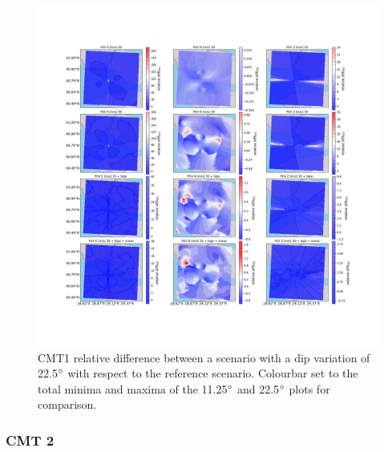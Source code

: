 \documentclass[../Text/00main.tex]{subfiles}
\begin{document}
\begin{figure}[h]
    \centering
    \includegraphics[width=1\linewidth,trim = 2cm 5cm 1cm 5cm, clip]{images_results/dip_variation_epsilon25_sc1.png}
    \caption{CMT1 relative difference between a scenario with a dip variation of 22.5$\degree$ with respect to the reference scenario. Colourbar set to the total minima and maxima of the 11.25$\degree$ and 22.5$\degree$ plots for comparison.}
    \label{fig:ref_eps25-1_dip}
\end{figure}

\FloatBarrier

\subsubsection{CMT 2}
\end{document}
